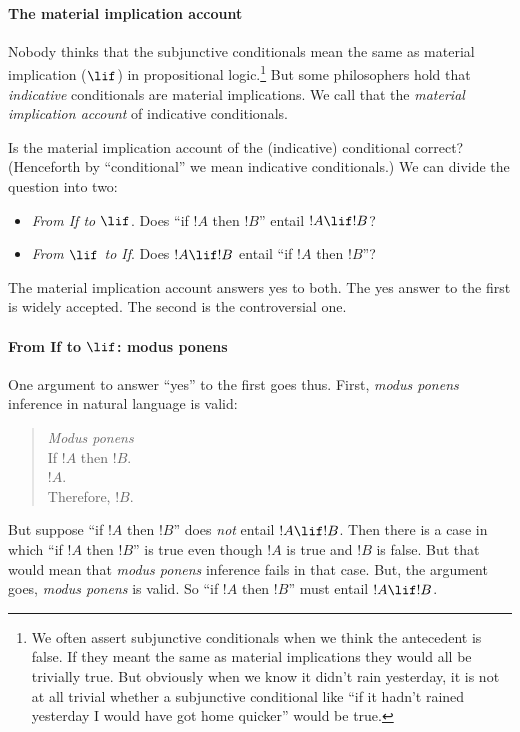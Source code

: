 \documentclass[../../../include/open-logic-section]{subfiles}
\begin{document}
\paragraph*{The material implication account}

Nobody thinks that the subjunctive conditionals mean the same as material implication ($\lif$) in propositional logic.\footnote{We often assert subjunctive conditionals when we think the antecedent is false. If they meant the same as material implications they would all be trivially true. But obviously when we know it didn't rain yesterday, it is not at all trivial whether a subjunctive conditional like ``if it hadn't rained yesterday I would have got home quicker'' would be true.} But some philosophers hold that \emph{indicative} conditionals are material implications. We call that the \emph{material implication account} of indicative conditionals. 

Is the material implication account of the (indicative) conditional correct? (Henceforth by ``conditional'' we mean indicative conditionals.) We can divide the question into two:

\begin{itemize}
	\item \emph{From If to $\lif$}. Does ``if $!A$ then $!B$'' entail $!A \lif !B$? 
	\item \emph{From $\lif$ to If}. Does $!A \lif !B$ entail ``if $!A$ then $!B$''?
\end{itemize}

The material implication account answers yes to both. The yes answer to the first is widely accepted. The second is the controversial one. 

\paragraph*{From If to $\lif$: modus ponens}

One argument to answer ``yes'' to the first goes thus. First, \emph{modus ponens} inference in natural language is valid:

\begin{quote}
	\emph{Modus ponens}\\
	If $!A$ then $!B$.\\
	$!A$.\\
	Therefore, $!B$.
\end{quote}
	
But suppose ``if $!A$ then $!B$'' does \emph{not} entail $!A \lif !B$. Then there is a case in which ``if $!A$ then $!B$'' is true even though $!A$ is true and $!B$ is false. But that would mean that \emph{modus ponens} inference fails in that case. But, the argument goes, \emph{modus ponens} is valid. So ``if $!A$ then $!B$'' must entail $!A \lif !B$.
\end{document}
